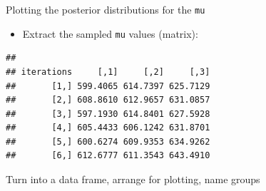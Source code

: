 \documentclass[
  ignorenonframetext,
]{beamer}
\newenvironment{Shaded}{\begin{snugshade}}{\end{snugshade}}
\newcommand{\DataTypeTok}[1]{\textcolor[rgb]{0.13,0.29,0.53}{#1}}
\newcommand{\KeywordTok}[1]{\textcolor[rgb]{0.13,0.29,0.53}{\textbf{#1}}}
\newcommand{\NormalTok}[1]{#1}
\newcommand{\OperatorTok}[1]{\textcolor[rgb]{0.81,0.36,0.00}{\textbf{#1}}}
\newcommand{\StringTok}[1]{\textcolor[rgb]{0.31,0.60,0.02}{#1}}
\providecommand{\tightlist}{%
  \setlength{\itemsep}{0pt}\setlength{\parskip}{0pt}}
\begin{document}
\begin{frame}[fragile]{Plotting the posterior distributions for the
\texttt{mu}}
\protect\hypertarget{plotting-the-posterior-distributions-for-the-mu}{}

\begin{itemize}
\tightlist
\item
  Extract the sampled \texttt{mu} values (matrix):
\end{itemize}

\begin{Shaded}
\end{Shaded}

\begin{verbatim}
##           
## iterations     [,1]     [,2]     [,3]
##       [1,] 599.4065 614.7397 625.7129
##       [2,] 608.8610 612.9657 631.0857
##       [3,] 597.1930 614.8401 627.5928
##       [4,] 605.4433 606.1242 631.8701
##       [5,] 600.6274 609.9353 634.9262
##       [6,] 612.6777 611.3543 643.4910
\end{verbatim}

\end{frame}

\begin{frame}[fragile]{Turn into a data frame, arrange for plotting,
name groups}
\protect\hypertarget{turn-into-a-data-frame-arrange-for-plotting-name-groups}{}

\begin{Shaded}
\end{Shaded}

\end{frame}
\end{document}
